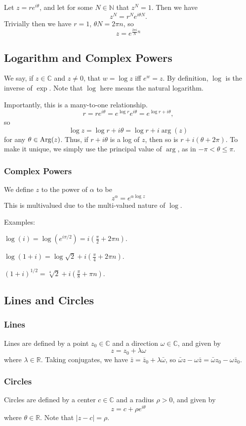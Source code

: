\documentclass[12pt]{article}
\begin{document}
Let $z = re^{i\theta }$, and let for some $N \in \mathbb{N}$ that $z^{N} = 1$.
Then we have
\[
z^{N} = r^{N}e^{i\theta N}.
\]
Trivially then we have $r = 1$, $\theta N= 2\pi n$, so
\[
    z = e^{\frac{2\pi i}{N}n}
\]

\subsection{Logarithm and Complex Powers}

We say, if $z \in \mathbb{C}$ and $z \ne 0$, that $w = \log z$ iff $e^{w} = z$.
By definition, $\log$ is the inverse of $\exp$. 
Note that $\log$ here means the natural logarithm.

Importantly, this is a many-to-one relationship.
\[
r = re^{i\theta } = e^{\log r}e^{i\theta } = e^{\log r + i\theta },
\]
so
\[
\log z = \log r + i\theta  = \log r + i \arg(z)
\]
for any $\theta  \in \operatorname{Arg}(z)$.
Thus, if $r + i\theta $ is a log of $z$, then so is $r + i(\theta + 2\pi)$.
To make it unique, we simply use the principal value of $\arg$,
as in $-\pi < \theta  \le \pi$.

\subsubsection*{Complex Powers}

We define $z$ to the power of $\alpha $ to be
\[
z^{\alpha } = e^{\alpha \log z}
\]
This is multivalued due to the multi-valued nature of $\log$.

Examples:
\begin{compactitem}
\item $\log(i) = \log(e^{i\pi / 2}) = i \left(\frac{\pi}{2} + 2\pi n\right)$.
\item $\log(1 + i) = \log\sqrt{2} + i\left(\frac{\pi}{4} + 2\pi n\right)$.
\item $(1 + i)^{1/2} = \sqrt[4]{2} + i\left(\frac{\pi}{8} + \pi n\right)$.
\end{compactitem}

\subsection{Lines and Circles}

\subsubsection*{Lines}

Lines are defined by a point $z_{0} \in \mathbb{C}$ and a direction $\omega \in \mathbb{C}$,
and given by
\[
z = z_{0} + \lambda \omega
\]
where $\lambda \in \mathbb{R}$.
Taking conjugates, we have $\bar z = \bar z_{0} + \lambda \bar \omega$,
so $\bar \omega z - \omega \bar z = \bar \omega z_{0} - \omega \bar z_{0}$.

\subsubsection*{Circles}

Circles are defined by a center $c \in \mathbb{C}$ and a radius $\rho > 0$,
and given by
\[
z = c + \rho e^{i\theta}
\]
where $\theta \in \mathbb{R}$. Note that $|z - c| = \rho$.
\end{document}
